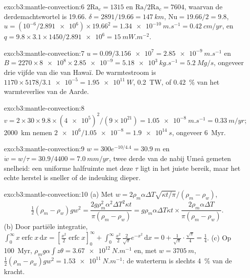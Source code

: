 \begin{solution}{exo:b3:mantle-convection:6}
$2\mathrm{Ra}_c = 1315$ en $\mathrm{Ra}/2\mathrm{Ra}_c = 7604$, waarvan de
derdemachtswortel is 19.66. $\delta = 2891/19.66 = \qty{147}{km}$, $\mathrm{Nu} = 19.66/2 =
9.8$, $u = (10^{-6}/\num{2.891e6})\times19.66^2 = \qty{1.34e-10}{m.s^{-1}} =
\qty{0.42}{cm/yr}$, en $q = 9.8\times3.1\times1450/\num{2.891e6} =
\qty{15}{mW.m^{-2}}$.
\end{solution}

\begin{solution}{exo:b3:mantle-convection:7}
$u = 0.09/\num{3.156e7} = \qty{2.85e-9}{m.s^{-1}}$ en $B = 2270\times\num{8e8}
\times\num{2.85e-9} = \qty{5.18e3}{kg.s^{-1}} = \qty{5.2}{Mg/s}$, ongeveer
drie vijfde van die van Hawaï. De warmtestroom is $1170\times5178/\num{3.1e-5} =
\qty{1.95e11}{W}$, \qty{0.2}{TW}, of \qty{0.42}{\percent} van het
warmteverlies van de Aarde.
\end{solution}

\begin{solution}{exo:b3:mantle-convection:8}
$v = 2\times30\times9.8\times(\num{4e5})^2/(9\times10^{21}) =
\qty{1.05e-8}{m.s^{-1}} = \qty{0.33}{m/yr}$; \qty{2000}{km} nemen
$\num{2e6}/\num{1.05e-8} = \qty{1.9e14}{s}$, ongeveer \qty{6}{Myr}.
\end{solution}

\begin{solution}{exo:b3:mantle-convection:9}
$w = 300e^{-10/4.4} = \qty{30.9}{m}$ en $\dot w = w/\tau = 30.9/4400 =
\qty{7.0}{mm/yr}$, twee derde van de nabij Umeå gemeten snelheid: een uniforme
halfruimte met deze $\tau$ ligt in het juiste bereik, maar het echte herstel is
sneller of de indeuking dieper.
\end{solution}

\begin{solution}{exo:b3:mantle-convection:10}
(a) Met $w = 2\rho_m\alpha\Delta T\sqrt{\kappa t/\pi}/(\rho_m - \rho_w)$,
\[
  \tfrac12(\rho_m - \rho_w)gw^2 = \frac{2g\rho_m^2\alpha^2\Delta T^2\kappa t}
  {\pi(\rho_m - \rho_w)} = g\rho_m\alpha\Delta T\kappa t\times
  \frac{2\rho_m\alpha\Delta T}{\pi(\rho_m - \rho_w)} .
\] (b) Door partiële integratie,
$\int_0^\infty x\operatorname{erfc}x\,\mathrm dx = [\tfrac{x^2}2\operatorname{erfc}
x]_0^\infty + \int_0^\infty\tfrac{x^2}2\,\tfrac2{\sqrt\pi}e^{-x^2}\,\mathrm dx =
0 + \tfrac1{\sqrt\pi}\cdot\tfrac{\sqrt\pi}4 = \tfrac14$. (c) Op \qty{100}{Myr},
$\rho_mg\alpha\int z\theta = \qty{3.67e12}{N.m^{-1}}$ en, met $w =
\qty{3705}{m}$, $\tfrac12(\rho_m - \rho_w)gw^2 = \qty{1.53e11}{N.m^{-1}}$: de
waterterm is slechts \qty{4}{\percent} van de kracht.
\end{solution}

